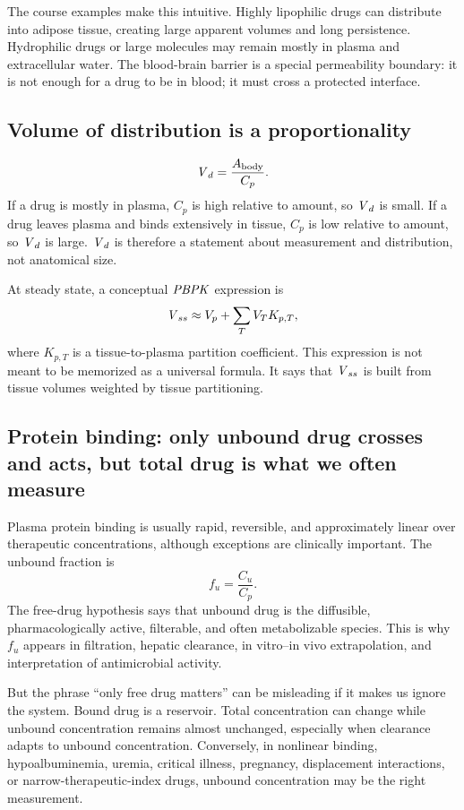 \documentclass[a4paper]{article}
\newcommand{\Vd}{\ensuremath{\pksym{V}_d}}
\newcommand{\Vss}{\ensuremath{\pksym{V}_{ss}}}
\newcommand{\fu}{\ensuremath{f_u}}
\newcommand{\PBPK}{\ensuremath{\pksym{PBPK}}}
\begin{document}
The course examples make this intuitive. Highly lipophilic drugs can distribute into adipose tissue, creating large apparent volumes and long persistence. Hydrophilic drugs or large molecules may remain mostly in plasma and extracellular water. The blood-brain barrier is a special permeability boundary: it is not enough for a drug to be in blood; it must cross a protected interface.

\subsection{Volume of distribution is a proportionality}

\[
  \Vd = \frac{A_{\pklab{body}}}{C_p}.
\]
If a drug is mostly in plasma, \(C_p\) is high relative to amount, so \(\Vd\) is small. If a drug leaves plasma and binds extensively in tissue, \(C_p\) is low relative to amount, so \(\Vd\) is large. \Vd{} is therefore a statement about measurement and distribution, not anatomical size.

At steady state, a conceptual \PBPK{} expression is
\[
  \Vss
  \approx
  V_p
  +
  \sum_T V_T K_{p,T},
\]
where \(K_{p,T}\) is a tissue-to-plasma partition coefficient. This expression is not meant to be memorized as a universal formula. It says that \Vss{} is built from tissue volumes weighted by tissue partitioning.

\subsection{Protein binding: only unbound drug crosses and acts, but total drug is what we often measure}

Plasma protein binding is usually rapid, reversible, and approximately linear over therapeutic concentrations, although exceptions are clinically important. The unbound fraction is
\[
  \fu=\frac{C_u}{C_p}.
\]
The free-drug hypothesis says that unbound drug is the diffusible, pharmacologically active, filterable, and often metabolizable species. This is why \(\fu\) appears in filtration, hepatic clearance, in vitro--in vivo extrapolation, and interpretation of antimicrobial activity.

But the phrase ``only free drug matters'' can be misleading if it makes us ignore the system. Bound drug is a reservoir. Total concentration can change while unbound concentration remains almost unchanged, especially when clearance adapts to unbound concentration. Conversely, in nonlinear binding, hypoalbuminemia, uremia, critical illness, pregnancy, displacement interactions, or narrow-therapeutic-index drugs, unbound concentration may be the right measurement.
\end{document}
